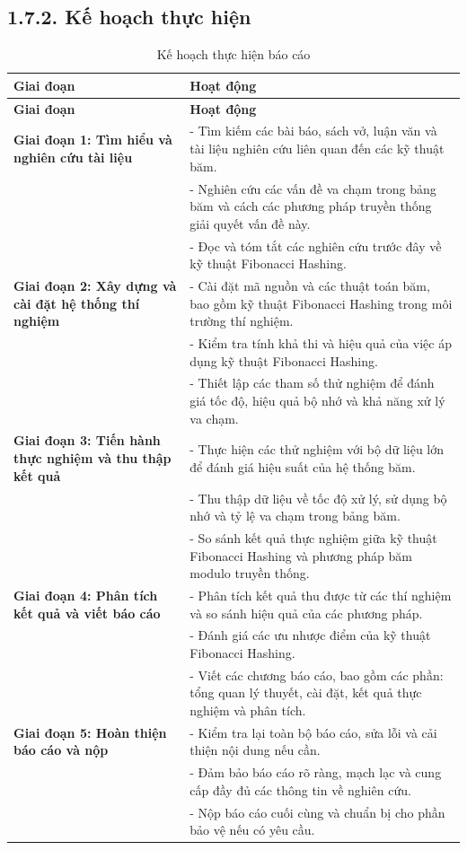 \documentclass[12pt,a4paper]{report}
\begin{document}
\subsection*{1.7.2. Kế hoạch thực hiện}
\begin{longtable}{|p{6cm}|p{12cm}|}  %
\caption{Kế hoạch thực hiện báo cáo} \label{tab:kehoach} \\  %
\hline
\textbf{Giai đoạn} & \textbf{Hoạt động} \\
\hline
\endfirsthead
\hline
\textbf{Giai đoạn} & \textbf{Hoạt động} \\
\hline
\endhead
\hline
\endfoot
\hline
\textbf{Giai đoạn 1: Tìm hiểu và nghiên cứu tài liệu}  & 
- Tìm kiếm các bài báo, sách vở, luận văn và tài liệu nghiên cứu liên quan đến các kỹ thuật băm. \\
& - Nghiên cứu các vấn đề va chạm trong bảng băm và cách các phương pháp truyền thống giải quyết vấn đề này. \\
& - Đọc và tóm tắt các nghiên cứu trước đây về kỹ thuật Fibonacci Hashing. \\
\hline
\textbf{Giai đoạn 2: Xây dựng và cài đặt hệ thống thí nghiệm} & 
- Cài đặt mã nguồn và các thuật toán băm, bao gồm kỹ thuật Fibonacci Hashing trong môi trường thí nghiệm. \\
& - Kiểm tra tính khả thi và hiệu quả của việc áp dụng kỹ thuật Fibonacci Hashing. \\
& - Thiết lập các tham số thử nghiệm để đánh giá tốc độ, hiệu quả bộ nhớ và khả năng xử lý va chạm. \\
\hline
\textbf{Giai đoạn 3: Tiến hành thực nghiệm và thu thập kết quả} & 
- Thực hiện các thử nghiệm với bộ dữ liệu lớn để đánh giá hiệu suất của hệ thống băm. \\
& - Thu thập dữ liệu về tốc độ xử lý, sử dụng bộ nhớ và tỷ lệ va chạm trong bảng băm. \\
& - So sánh kết quả thực nghiệm giữa kỹ thuật Fibonacci Hashing và phương pháp băm modulo truyền thống. \\
\hline
\textbf{Giai đoạn 4: Phân tích kết quả và viết báo cáo}  & 
- Phân tích kết quả thu được từ các thí nghiệm và so sánh hiệu quả của các phương pháp. \\
& - Đánh giá các ưu nhược điểm của kỹ thuật Fibonacci Hashing. \\
& - Viết các chương báo cáo, bao gồm các phần: tổng quan lý thuyết, cài đặt, kết quả thực nghiệm và phân tích. \\
\hline
\textbf{Giai đoạn 5: Hoàn thiện báo cáo và nộp}  & 
- Kiểm tra lại toàn bộ báo cáo, sửa lỗi và cải thiện nội dung nếu cần. \\
& - Đảm bảo báo cáo rõ ràng, mạch lạc và cung cấp đầy đủ các thông tin về nghiên cứu. \\
& - Nộp báo cáo cuối cùng và chuẩn bị cho phần bảo vệ nếu có yêu cầu. \\
\hline
\end{longtable}
\end{document}

